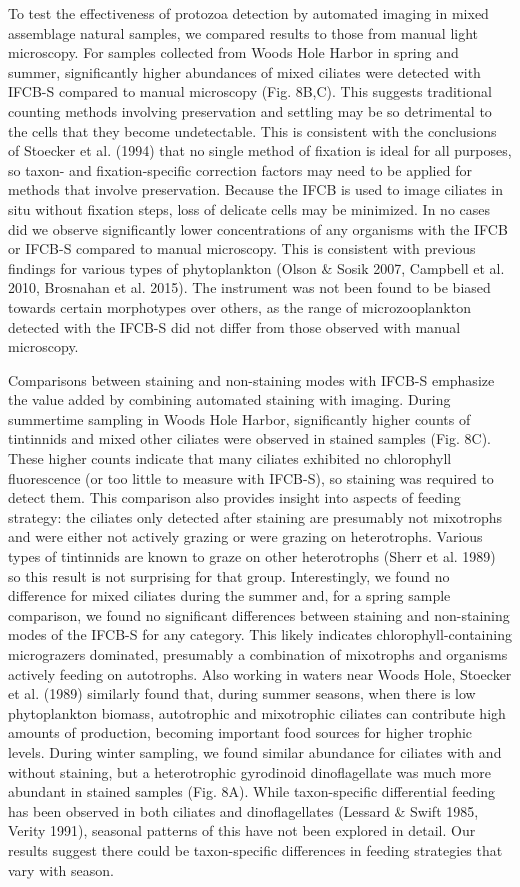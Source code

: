 To test the effectiveness of protozoa detection by automated imaging in mixed assemblage natural
samples, we compared results to those from manual light microscopy. For samples collected from Woods Hole Harbor in spring and summer, significantly higher abundances of mixed ciliates were detected with IFCB-S compared to manual microscopy (Fig. 8B,C). This suggests traditional counting methods involving preservation and settling may be so detrimental to the cells that they become undetectable. This is consistent with the conclusions of Stoecker et al. (1994) that no
single method of fixation is ideal for all purposes, so taxon- and fixation-specific correction factors may need to be applied for methods that involve preservation. Because the IFCB is used to image ciliates in situ without fixation steps, loss of delicate cells may be minimized. In no cases did we observe significantly lower concentrations of any organisms with the IFCB or IFCB-S compared to manual microscopy. This is consistent with previous findings for various types of phytoplankton (Olson \& Sosik 2007, Campbell et al. 2010, Brosnahan et al. 2015). The instrument was not been found to be biased towards certain morphotypes over others, as the range of microzooplankton detected with the IFCB-S did not differ from those observed with manual microscopy.

Comparisons between staining and non-staining modes with IFCB-S emphasize the value added by combining automated staining with imaging. During summertime sampling in Woods Hole Harbor, significantly higher counts of tintinnids and mixed other ciliates were observed in stained samples (Fig. 8C). These higher counts indicate that many ciliates exhibited no chlorophyll fluorescence (or too little to measure with IFCB-S), so staining was required to detect them. This comparison also provides insight into aspects of feeding strategy: the ciliates only detected after staining are presumably not mixotrophs and were either not actively grazing or were grazing on heterotrophs. Various types of tintinnids are known to graze on other heterotrophs (Sherr et al. 1989) so this result is not surprising for that group. Interestingly, we found no difference for mixed ciliates during the summer and, for a spring sample comparison, we found no significant differences between staining and non-staining modes of the IFCB-S for any category. This likely indicates chlorophyll-containing micrograzers dominated, presumably a combination of mixotrophs and organisms actively feeding on autotrophs. Also working in waters near Woods Hole, Stoecker et al. (1989) similarly found that, during summer seasons, when there is low phytoplankton biomass, autotrophic and mixotrophic ciliates can contribute high amounts of production, becoming important food sources for higher trophic levels. During winter sampling, we found similar abundance for ciliates with and without staining, but a heterotrophic gyrodinoid dinoflagellate was much more abundant in stained samples (Fig. 8A). While taxon-specific differential feeding has been observed in both ciliates and dinoflagellates (Lessard \& Swift 1985, Verity 1991), seasonal patterns of this have not been explored in detail. Our results suggest there could be taxon-specific differences in feeding strategies that vary with season.

